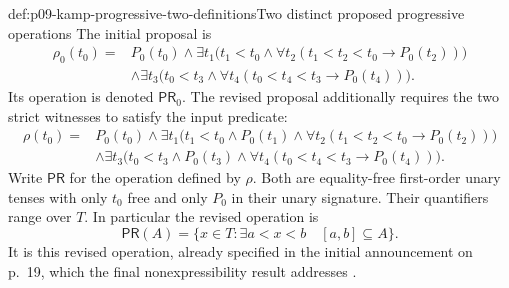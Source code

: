 \begin{hbdefinition}{def:p09-kamp-progressive-two-definitions}{Two distinct proposed progressive operations}
The initial proposal is
\[
\begin{aligned}
 \rho_0(t_0)={}&P_0(t_0)\land
   \exists t_1\bigl(t_1<t_0\land
        \forall t_2(t_1<t_2<t_0\to P_0(t_2))\bigr)\\
 &\land\exists t_3\bigl(t_0<t_3\land
        \forall t_4(t_0<t_4<t_3\to P_0(t_4))\bigr).
\end{aligned}
\]
Its operation is denoted \(\mathsf{PR}_0\). The revised
proposal additionally requires the two strict witnesses to satisfy
the input predicate:
\[
\begin{aligned}
 \rho(t_0)={}&P_0(t_0)\land
   \exists t_1\bigl(t_1<t_0\land P_0(t_1)\land
        \forall t_2(t_1<t_2<t_0\to P_0(t_2))\bigr)\\
 &\land\exists t_3\bigl(t_0<t_3\land P_0(t_3)\land
        \forall t_4(t_0<t_4<t_3\to P_0(t_4))\bigr).
\end{aligned}
\]
Write \(\mathsf{PR}\) for the operation defined by \(\rho\).
Both are equality-free first-order unary tenses with only \(t_0\)
free and only \(P_0\) in their unary signature. Their quantifiers
range over \(T\). In particular the revised operation is
\[
 \mathsf{PR}(A)=\{x\in T:\exists a<x<b\quad[a,b]\subseteq A\}.
\]
It is this revised operation, already specified in the initial
announcement on p.~19, which the final nonexpressibility result
addresses
\cite[pp.~19, 112--113]{Kamp1968}.
\end{hbdefinition}

